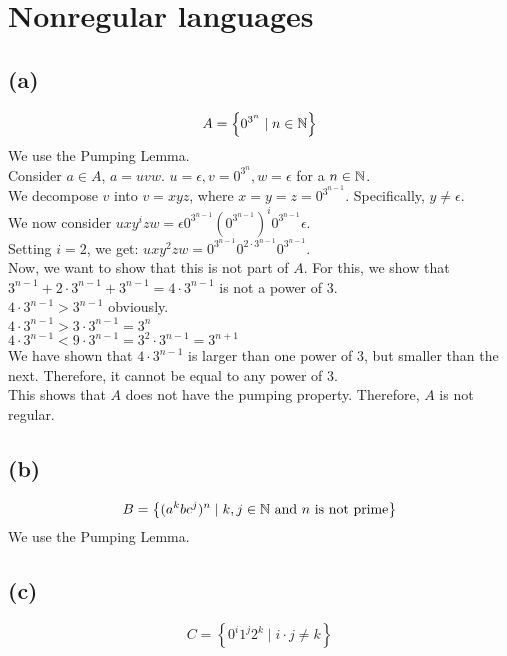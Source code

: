 

\setcounter{section}{1}


\section{Nonregular languages}

\subsection{(a)}
$$A = \left\{ 0^{3^{n}} \mid n \in \mathbb{N} \right\}$$
We use the Pumping Lemma.\\
Consider $a \in A$, $a = uvw$. $u=\epsilon, v=0^{3^{n}}, w=\epsilon$ for a $n \in \mathbb{N}$.\\
We decompose $v$ into $v=xyz$, where $x=y=z=0^{3^{n-1}}$. Specifically, $y\neq\epsilon$.\\
We now consider $uxy^{i}zw = \epsilon 0^{3^{n-1}} ( 0^{3^{n-1}})^{i} 0^{3^{n-1}} \epsilon$.\\
Setting $i=2$, we get: $uxy^{2}zw=0^{3^{n-1}}0^{2\cdot3^{n-1}}0^{3^{n-1}}$.\\
Now, we want to show that this is not part of $A$. For this, we show that $3^{n-1}+2\cdot 3^{n-1} + 3^{n-1} = 4\cdot 3^{n-1}$ is not a power of $3$.\\
$4\cdot 3^{n-1} > 3^{n-1}$ obviously.\\
$4\cdot 3^{n-1} > 3\cdot 3^{n-1} = 3^{n}$\\
$4\cdot 3^{n-1} < 9\cdot 3^{n-1} = 3^{2}\cdot 3^{n-1} = 3^{n+1}$\\
We have shown that $4\cdot 3^{n-1}$ is larger than one power of $3$, but smaller than the next. Therefore, it cannot be equal to any power of $3$.\\
This shows that $A$ does not have the pumping property. Therefore, $A$ is not regular.

\subsection{(b)}
$$B = \left\{ (a^{k}bc^{j})^{n} \mid k,j \in \mathbb{N}\text{ and }n\text{ is not prime} \right\}$$
We use the Pumping Lemma.\\


\subsection{(c)}
$$C = \left\{ 0^{i}1^{j}2^{k} \mid i\cdot j \neq k \right\}$$

